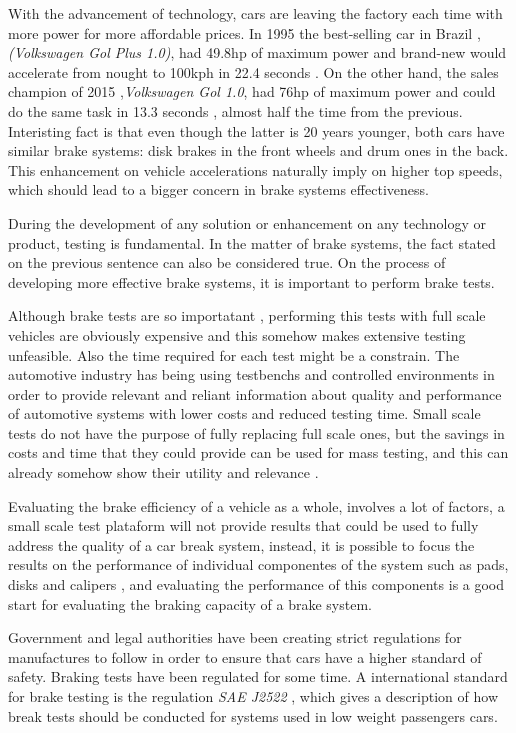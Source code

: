	With the advancement of technology, cars are leaving the factory each time with more power for more affordable prices. In 1995 the best-selling car in Brazil \cite{lideres-vendas-brasil}, \textit{(Volkswagen Gol Plus 1.0)}, had 49.8hp of maximum power and brand-new would accelerate from nought to 100kph in 22.4 seconds \cite{cnwgol1993}. On the other hand, the sales champion of 2015 ,\textit{Volkswagen Gol 1.0}, had 76hp of maximum power and could do the same task in 13.3 seconds \cite{cnwgol2013}, almost half the time from the previous. Interisting fact is that even though the latter is 20 years younger, both cars have similar brake systems: disk brakes in the front wheels and drum ones in the back. This enhancement on vehicle accelerations naturally imply on higher top speeds, which should lead to a bigger concern in brake systems effectiveness.
	\par
	During the development of any solution or enhancement on any technology or product, testing is fundamental. In the matter of brake systems, the fact stated on the previous sentence can also be considered true. On the process of developing more effective brake systems, it is important to perform brake tests.
	\par
	Although brake tests are so importatant \cite{abendroth1985new}, performing this tests with full scale vehicles are obviously expensive and this somehow makes extensive testing unfeasible. Also the time required for each test might be a constrain. The automotive industry has being using testbenchs and controlled environments in order to provide relevant and reliant information about quality and performance of automotive systems with lower costs and reduced testing time. Small scale tests do not have the purpose of fully replacing full scale ones, but the savings in costs and time that they could provide can be used for mass testing, and this can already somehow show their utility and relevance \cite{gardinalli2005comparaccao}. 
	\par
	Evaluating the brake efficiency of a vehicle as a whole, involves a lot of factors, a small scale test plataform will not provide results that could be used to fully address the quality of a car break system, instead, it is possible to focus the results on the performance of individual componentes of the system such as pads, disks and calipers \cite{halderman2016automotive}, and evaluating the performance of this components is a good start for evaluating the braking capacity of a brake system.
	\par
	Government and legal authorities have been creating strict regulations for manufactures to follow in order to ensure that cars have a higher standard of safety. Braking tests have been regulated for some time. A international standard for brake testing is the regulation \textit{SAE J2522} \cite{sae}, which gives a description of how break tests should be conducted for systems used in low weight passengers cars.
